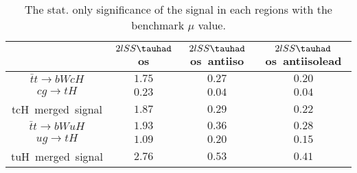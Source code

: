 \begin{table}
\footnotesize
\caption{The stat. only significance of the signal in each regions with the benchmark $\mu$ value.}
\centering
\begin{tabular}{|c|c|c|c|} \hline
 & $2lSS\tauhad$ os & $2lSS\tauhad$ os~antiiso & $2lSS\tauhad$ os~antiisolead\\\hline
$\bar{t}t\to bWcH$ & $1.75$ & $0.27$ & $0.20$\\\hline
$cg\to tH$ & $0.23$ & $0.04$ & $0.04$\\\hline
tcH~merged~signal & $1.87$ & $0.29$ & $0.22$\\\hline
$\bar{t}t\to bWuH$ & $1.93$ & $0.36$ & $0.28$\\\hline
$ug\to tH$ & $1.09$ & $0.20$ & $0.15$\\\hline
tuH~merged~signal & $2.76$ & $0.53$ & $0.41$\\\hline
\end{tabular}
\label{tab:significance}
\end{table}
